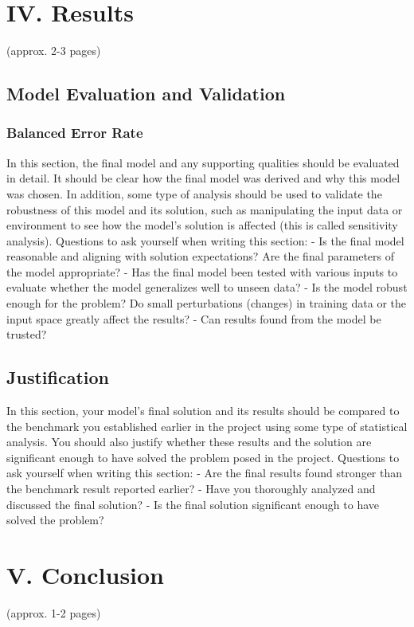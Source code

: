 \documentclass[12pt]{article}
\begin{document}
\section{IV. Results}
(approx. 2-3 pages)

\subsection{Model Evaluation and Validation}
\label{model_val}

\subsubsection{Balanced Error Rate}
In this section, the final model and any supporting qualities should be evaluated in detail. It should be clear how the final model was derived and why this model was chosen. In addition, some type of analysis should be used to validate the robustness of this model and its solution, such as manipulating the input data or environment to see how the model’s solution is affected (this is called sensitivity analysis). Questions to ask yourself when writing this section:
- Is the final model reasonable and aligning with solution expectations? Are the final parameters of the model appropriate?
- Has the final model been tested with various inputs to evaluate whether the model generalizes well to unseen data?
- Is the model robust enough for the problem? Do small perturbations (changes) in training data or the input space greatly affect the results?
- Can results found from the model be trusted?

\subsection{Justification}
In this section, your model’s final solution and its results should be compared to the benchmark you established earlier in the project using some type of statistical analysis. You should also justify whether these results and the solution are significant enough to have solved the problem posed in the project. Questions to ask yourself when writing this section:
- Are the final results found stronger than the benchmark result reported earlier?
- Have you thoroughly analyzed and discussed the final solution?
- Is the final solution significant enough to have solved the problem?


\section{V. Conclusion}
(approx. 1-2 pages)
\end{document}

